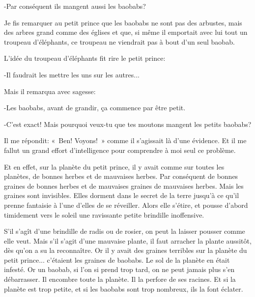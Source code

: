 \documentclass{report}
\begin{document}
-Par conséquent ils mangent aussi les baobabs?

Je fis remarquer au petit prince que les baobabs ne sont pas des arbustes, mais des arbres grand comme des églises et que, si même il emportait avec lui tout un troupeau d'éléphants, ce troupeau ne viendrait pas à bout d'un seul baobab.

L'idée du troupeau d'éléphants fit rire le petit prince:

-Il faudrait les mettre les uns sur les autres...

Mais il remarqua avec sagesse:


-Les baobabs, avant de grandir, ça commence par être petit.

-C'est exact! Mais pourquoi veux-tu que tes moutons mangent les petits baobabs?

Il me répondit: «~Ben! Voyons!~» comme il s'agissait là d'une évidence. Et il me fallut un grand effort d'intelligence pour comprendre à moi seul ce problème.

Et en effet, sur la planète du petit prince, il y avait comme sur toutes les planètes, de bonnes herbes et de mauvaises herbes. Par conséquent de bonnes graines de bonnes herbes et de mauvaises graines de mauvaises herbes. Mais les graines sont invisibles. Elles dorment dans le secret de la terre jusqu'à ce qu'il prenne fantaisie à l'une d'elles de se réveiller. Alors elle s'étire, et pousse d'abord timidement vers le soleil une ravissante petite brindille inoffensive.

S'il s'agît d'une brindille de radis ou de rosier, on peut la laisser pousser comme elle veut. Mais s'il s'agit d'une mauvaise plante, il faut arracher la plante aussitôt, dès qu'on a su la reconnaître. Or il y avait des graines terribles sur la planète du petit prince... c'étaient les graines de baobabs. Le sol de la planète en était infesté. Or un baobab, si l'on si prend trop tard, on ne peut jamais plus s'en débarrasser. Il encombre toute la planète. Il la perfore de ses racines. Et si la planète est trop petite, et si les baobabs sont trop nombreux, ils la font éclater.
\end{document}
